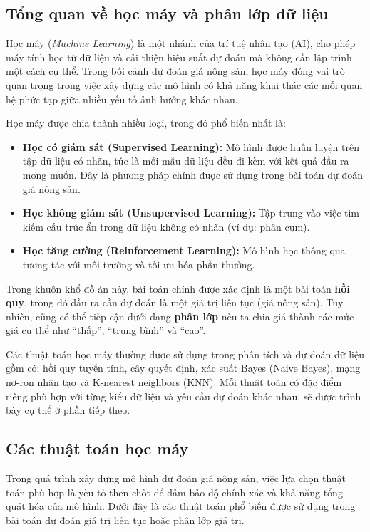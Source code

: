 \subsection{ Tổng quan về học máy và phân lớp dữ liệu}

Học máy (\textit{Machine Learning}) là một nhánh của trí tuệ nhân tạo (AI), cho phép máy tính học từ dữ liệu và cải thiện hiệu suất dự đoán mà không cần lập trình một cách cụ thể. Trong bối cảnh dự đoán giá nông sản, học máy đóng vai trò quan trọng trong việc xây dựng các mô hình có khả năng khai thác các mối quan hệ phức tạp giữa nhiều yếu tố ảnh hưởng khác nhau.

Học máy được chia thành nhiều loại, trong đó phổ biến nhất là:
\begin{itemize}
    \item \textbf{Học có giám sát (Supervised Learning):} Mô hình được huấn luyện trên tập dữ liệu có nhãn, tức là mỗi mẫu dữ liệu đều đi kèm với kết quả đầu ra mong muốn. Đây là phương pháp chính được sử dụng trong bài toán dự đoán giá nông sản.
    
    \item \textbf{Học không giám sát (Unsupervised Learning):} Tập trung vào việc tìm kiếm cấu trúc ẩn trong dữ liệu không có nhãn (ví dụ: phân cụm).
    
    \item \textbf{Học tăng cường (Reinforcement Learning):} Mô hình học thông qua tương tác với môi trường và tối ưu hóa phần thưởng.
\end{itemize}

Trong khuôn khổ đồ án này, bài toán chính được xác định là một bài toán \textbf{hồi quy}, trong đó đầu ra cần dự đoán là một giá trị liên tục (giá nông sản). Tuy nhiên, cũng có thể tiếp cận dưới dạng \textbf{phân lớp} nếu ta chia giá thành các mức giá cụ thể như “thấp”, “trung bình” và “cao”.

Các thuật toán học máy thường được sử dụng trong phân tích và dự đoán dữ liệu gồm có: hồi quy tuyến tính, cây quyết định, xác suất Bayes (Naive Bayes), mạng nơ-ron nhân tạo và K-nearest neighbors (KNN). Mỗi thuật toán có đặc điểm riêng phù hợp với từng kiểu dữ liệu và yêu cầu dự đoán khác nhau, sẽ được trình bày cụ thể ở phần tiếp theo.


\subsection{ Các thuật toán học máy}

Trong quá trình xây dựng mô hình dự đoán giá nông sản, việc lựa chọn thuật toán phù hợp là yếu tố then chốt để đảm bảo độ chính xác và khả năng tổng quát hóa của mô hình. Dưới đây là các thuật toán phổ biến được sử dụng trong bài toán dự đoán giá trị liên tục hoặc phân lớp giá trị.

